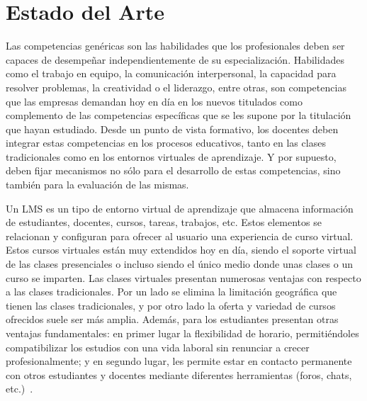 

%


\chapter{Estado del Arte}
\label{cha:State of the Art}

\ifpdf
    \graphicspath{{2_state_of_the_art/figures/PNG/}{2_state_of_the_art/figures/PDF/}{2_state_of_the_art/figures/}}
\else
    \graphicspath{{2_state_of_the_art/figures/EPS/}{2_state_of_the_art/figures/}}
\fi



Las competencias genéricas son las habilidades que los profesionales deben ser capaces de desempeñar independientemente de su especialización. Habilidades como el trabajo en equipo, la comunicación interpersonal, la capacidad para resolver problemas, la creatividad o el liderazgo, entre otras, son competencias que las empresas demandan hoy en día en los nuevos titulados como complemento de las competencias específicas que se les supone por la titulación que hayan estudiado. Desde un punto de vista formativo, los docentes deben integrar estas competencias en los procesos educativos, tanto en las clases tradicionales como en los entornos virtuales de aprendizaje. Y por supuesto, deben fijar mecanismos no sólo para el desarrollo de estas competencias, sino también para la evaluación de las mismas.

Un LMS es un tipo de entorno virtual de aprendizaje que almacena información de estudiantes, docentes, cursos, tareas, trabajos, etc. Estos elementos se relacionan y configuran para ofrecer al usuario una experiencia de curso virtual. Estos cursos virtuales están muy extendidos hoy en día, siendo el soporte virtual de las clases presenciales o incluso siendo el único medio donde unas clases o un curso se imparten. Las clases virtuales presentan numerosas ventajas con respecto a las clases tradicionales. Por un lado se elimina la limitación geográfica que tienen las clases tradicionales, y por otro lado la oferta y variedad de cursos ofrecidos suele ser más amplia. Además, para los estudiantes presentan otras ventajas fundamentales: en primer lugar la flexibilidad de horario, permitiéndoles compatibilizar los estudios con una vida laboral sin renunciar a crecer profesionalmente; y en segundo lugar, les permite estar en contacto permanente con otros estudiantes y docentes mediante diferentes herramientas (foros, chats, etc.)~\cite{alAjlan:2008}.

